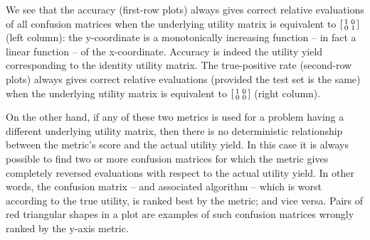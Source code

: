 \documentclass[\ifafour a4paper,12pt,\else a5paper,10pt,\fi%
onecolumn,oneside,article,%
british%
]{memoir}
\theoremstyle{remark}
\theoremstyle{innote}
\renewcommand*{\|}[1][]{\nonscript\:#1\vert\nonscript\:\mathopen{}}
\newcommand*{\fig}{fig.}%
\newcommand*{\sumatrix}[4]{\begin{bsmallmatrix*}[r]#1&#2\\#3&#4\end{bsmallmatrix*}}
\begin{document}
% 

We see that the accuracy (first-row plots) always gives correct relative evaluations of all confusion matrices when the underlying utility matrix is equivalent to $\sumatrix{ 1}{0}{0}{1 }$ (left column): the y-coordinate is a monotonically increasing function -- in fact a linear function -- of the x-coordinate. Accuracy is indeed the utility yield corresponding to the identity utility matrix. The true-positive rate (second-row plots) always gives correct relative evaluations (provided the test set is the same) when the underlying utility matrix is equivalent to $\sumatrix{ 1}{0}{0}{0 }$ (right column).

On the other hand, if any of these two metrics is used for a problem having a different underlying utility matrix, then there is no deterministic relationship between the metric's score and the actual utility yield. In this case it is always possible to find two or more confusion matrices for which the metric gives completely reversed evaluations with respect to the actual utility yield. In other words, the confusion matrix -- and associated algorithm -- which is worst according to the true utility, is ranked best by the metric; and vice versa. Pairs of red triangular shapes in a plot are examples of such confusion matrices wrongly ranked by the y-axis metric.
\end{document}
